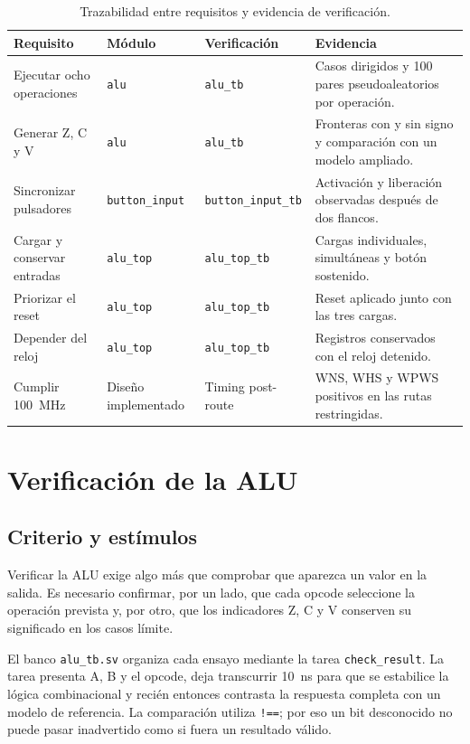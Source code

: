 \begin{table}[H]
	\centering
	\small
	\begin{tabularx}{\textwidth}{L{3.5cm}L{2.8cm}L{3.5cm}Y}
		\toprule
		\textbf{Requisito} & \textbf{Módulo} & \textbf{Verificación} &
		\textbf{Evidencia} \\
		\midrule
		Ejecutar ocho operaciones & \texttt{alu} & \texttt{alu\_tb} & Casos
		dirigidos y 100 pares pseudoaleatorios por operación. \\
		Generar Z, C y V & \texttt{alu} & \texttt{alu\_tb} & Fronteras con
		y sin signo y comparación con un modelo ampliado. \\
		Sincronizar pulsadores & \texttt{button\_input} &
		\texttt{button\_input\_tb} & Activación y liberación observadas
		después de dos flancos. \\
		Cargar y conservar entradas & \texttt{alu\_top} &
		\texttt{alu\_top\_tb} & Cargas individuales, simultáneas y botón sostenido. \\
		Priorizar el reset & \texttt{alu\_top} & \texttt{alu\_top\_tb} &
		Reset aplicado junto con las tres cargas. \\
		Depender del reloj & \texttt{alu\_top} & \texttt{alu\_top\_tb} &
		Registros conservados con el reloj detenido. \\
		Cumplir \SI{100}{\mega\hertz} & Diseño implementado & Timing
		post-route & WNS, WHS y WPWS positivos en las rutas restringidas. \\
		\bottomrule
	\end{tabularx}
	\caption{Trazabilidad entre requisitos y evidencia de verificación.}%
	\label{tab:trazabilidad}
\end{table}

\section{Verificación de la ALU}

\subsection{Criterio y estímulos}

Verificar la ALU exige algo más que comprobar que aparezca un valor en
la salida. Es necesario confirmar, por un lado, que cada opcode
seleccione la operación prevista y, por otro, que los indicadores Z, C
y V conserven su significado en los casos límite.

El banco \texttt{alu\_tb.sv} organiza cada ensayo mediante la tarea
\texttt{check\_result}. La tarea presenta A, B y el opcode, deja
transcurrir \SI{10}{\nano\second} para que se estabilice la lógica
combinacional y recién entonces contrasta la respuesta completa con un
modelo de referencia. La comparación utiliza \texttt{!==}; por eso un
bit desconocido no puede pasar inadvertido como si fuera un resultado
válido.

